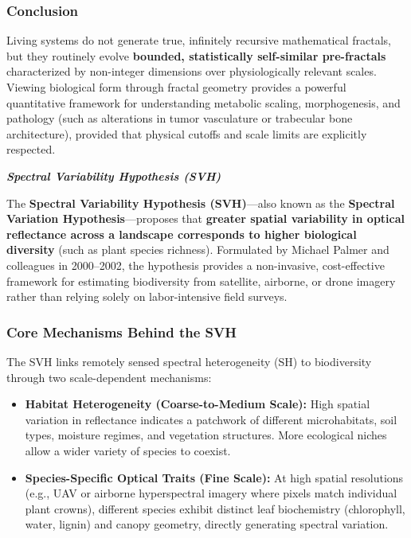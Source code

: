 \documentclass[12pt, letterpaper]{article}
\begin{document}
\subsubsection*{Conclusion}
Living systems do not generate true, infinitely recursive mathematical fractals, but they routinely evolve \textbf{bounded, statistically self-similar pre-fractals} characterized by non-integer dimensions over physiologically relevant scales. Viewing biological form through fractal geometry provides a powerful quantitative framework for understanding metabolic scaling, morphogenesis, and pathology (such as alterations in tumor vasculature or trabecular bone architecture), provided that physical cutoffs and scale limits are explicitly respected.







\bigskip
\LARGE
\begin{flushleft}
\textbf{\textit{Spectral Variability Hypothesis (SVH)}}
\end{flushleft}
\normalsize


The \textbf{Spectral Variability Hypothesis (SVH)}---also known as the \textbf{Spectral Variation Hypothesis}---proposes that \textbf{greater spatial variability in optical reflectance across a landscape corresponds to higher biological diversity} (such as plant species richness). Formulated by Michael Palmer and colleagues in 2000--2002, the hypothesis provides a non-invasive, cost-effective framework for estimating biodiversity from satellite, airborne, or drone imagery rather than relying solely on labor-intensive field surveys.

\subsubsection*{Core Mechanisms Behind the SVH}
The SVH links remotely sensed spectral heterogeneity (SH) to biodiversity through two scale-dependent mechanisms:

\begin{itemize}
    \item \textbf{Habitat Heterogeneity (Coarse-to-Medium Scale):} High spatial variation in reflectance indicates a patchwork of different microhabitats, soil types, moisture regimes, and vegetation structures. More ecological niches allow a wider variety of species to coexist.
    \item \textbf{Species-Specific Optical Traits (Fine Scale):} At high spatial resolutions (e.g., UAV or airborne hyperspectral imagery where pixels match individual plant crowns), different species exhibit distinct leaf biochemistry (chlorophyll, water, lignin) and canopy geometry, directly generating spectral variation.
\end{itemize}
\end{document}
